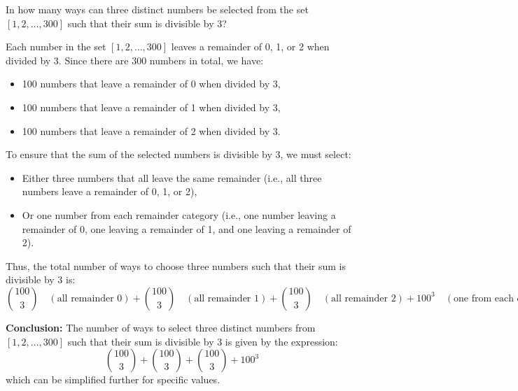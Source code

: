     \begin{example}
        In how many ways can three distinct numbers be selected from the set \( [1, 2, \dots, 300] \) such that their sum is divisible by 3?
        \vspace{1em}

        Each number in the set \( [1, 2, \dots, 300] \) leaves a remainder of 0, 1, or 2 when divided by 3. Since there are 300 numbers in total, we have:
        \begin{itemize}
            \item 100 numbers that leave a remainder of 0 when divided by 3,
            \item 100 numbers that leave a remainder of 1 when divided by 3,
            \item 100 numbers that leave a remainder of 2 when divided by 3.
        \end{itemize}
        \vspace{1em}

        To ensure that the sum of the selected numbers is divisible by 3, we must select:
        \begin{itemize}
            \item Either three numbers that all leave the same remainder (i.e., all three numbers leave a remainder of 0, 1, or 2),
            \item Or one number from each remainder category (i.e., one number leaving a remainder of 0, one leaving a remainder of 1, and one leaving a remainder of 2).
        \end{itemize}
        \vspace{1em}

        Thus, the total number of ways to choose three numbers such that their sum is divisible by 3 is:
        \[
        \binom{100}{3} \quad (\text{all remainder 0}) + \binom{100}{3} \quad (\text{all remainder 1}) + \binom{100}{3} \quad (\text{all remainder 2}) + 100^3 \quad (\text{one from each category})
        \]

        \textbf{Conclusion:} The number of ways to select three distinct numbers from \( [1, 2, \dots, 300] \) such that their sum is divisible by 3 is given by the expression:
        \[
        \binom{100}{3} + \binom{100}{3} + \binom{100}{3} + 100^3
        \]
        which can be simplified further for specific values.
    \end{example}

